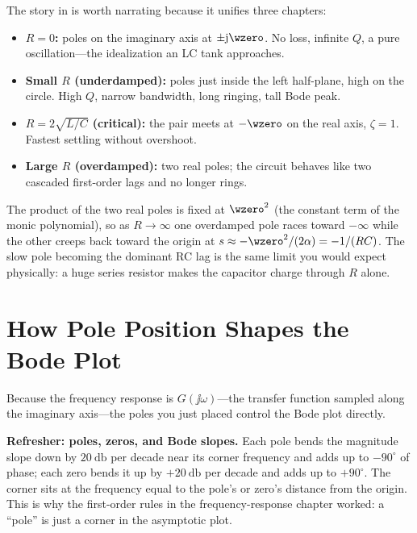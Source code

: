 The story in  is worth narrating because it unifies
three chapters:
\begin{itemize}
\item \textbf{\(R=0\):} poles on the imaginary axis at \(\pm\jj\wzero\). No loss,
infinite \(Q\), a pure oscillation---the idealization an LC tank approaches.
\item \textbf{Small \(R\) (underdamped):} poles just inside the left half-plane,
high on the circle. High \(Q\), narrow bandwidth, long ringing, tall Bode peak.
\item \textbf{\(R=2\sqrt{L/C}\) (critical):} the pair meets at \(-\wzero\) on the
real axis, \(\zeta=1\). Fastest settling without overshoot.
\item \textbf{Large \(R\) (overdamped):} two real poles; the circuit behaves like
two cascaded first-order lags and no longer rings.
\end{itemize}

\begin{advancedbox}
The product of the two real poles is fixed at \(\wzero^2\) (the constant term of
the monic polynomial), so as \(R\to\infty\) one overdamped pole races toward
\(-\infty\) while the other creeps back toward the origin at
\(s\approx-\wzero^2/(2\alpha)=-1/(RC)\). The slow pole becoming the dominant RC
lag is the same limit you would expect physically: a huge series resistor makes
the capacitor charge through \(R\) alone.
\end{advancedbox}

\section{How Pole Position Shapes the Bode Plot}
Because the frequency response is \(G(\jj\omega)\)---the transfer function
sampled along the imaginary axis---the poles you just placed control the Bode
plot directly.

\begin{controlsbox}
\textbf{Refresher: poles, zeros, and Bode slopes.} Each pole bends the magnitude
slope down by \(\SI{20}{\decibel}\) per decade near its corner frequency and adds
up to \(-90^\circ\) of phase; each zero bends it up by
\(+\SI{20}{\decibel}\) per decade and adds up to \(+90^\circ\). The corner sits
at the frequency equal to the pole's or zero's distance from the origin. This is
why the first-order rules in the frequency-response chapter worked: a ``pole'' is
just a corner in the asymptotic plot.
\end{controlsbox}

